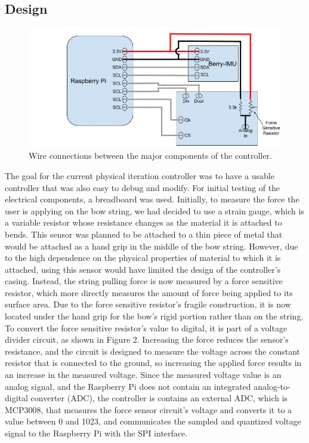 \documentclass[titlepage, 12pt]{scrartcl}
\begin{document}
    \subsection{Design}
    \begin{figure}
        \centering
        \includegraphics[scale=0.4]{figures/pi-pin.jpg}
        \caption{Wire connections between the major components of the controller.}
        \label{fig:pi-pin}
    \end{figure}
    The goal for the current physical iteration controller was to have a usable controller that was also easy to debug and modify. For initial testing of the electrical components, a breadboard was used. Initially, to measure the force the user is applying on the bow string, we had decided to use a strain gauge, which is a variable resistor whose resistance changes as the material it is attached to bends. This sensor was planned to be attached to a thin piece of metal that would be attached as a hand grip in the middle of the bow string. However, due to the high dependence on the physical properties of material to which it is attached, using this sensor would have limited the design of the controller's casing. Instead, the string pulling force is now measured by a force sensitive resistor, which more directly measures the amount of force being applied to its surface area. Due to the force sensitive resistor's fragile construction, it is now located under the hand grip for the bow's rigid portion rather than on the string. To convert the force sensitive resistor's value to digital, it is part of a voltage divider circuit, as shown in Figure 2. Increasing the force reduces the sensor's resistance, and the circuit is designed to measure the voltage across the constant resistor that is connected to the ground, so increasing the applied force results in an increase in the measured voltage. Since the measured voltage value is an analog signal, and the Raspberry Pi does not contain an integrated analog-to-digital converter (ADC), the controller is contains an external ADC, which is MCP3008, that measures the force sensor circuit's voltage and converts it to a value between 0 and 1023, and communicates the sampled and quantized voltage signal to the Raspberry Pi with the SPI interface. \par
\end{document}
